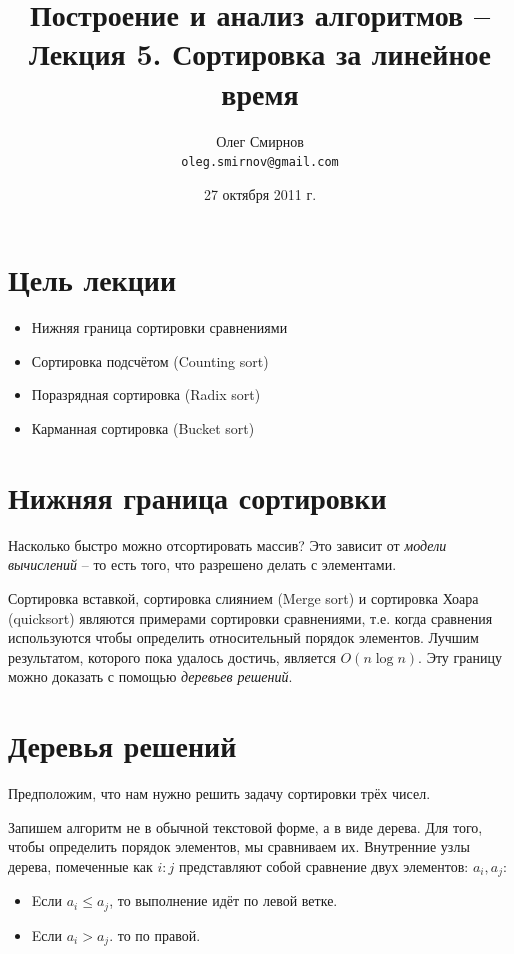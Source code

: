 \documentclass[a4paper,11pt]{article}
\author{Олег Смирнов\\
\texttt{oleg.smirnov@gmail.com}}
\date{27 октября 2011 г.}
\title{Построение и анализ алгоритмов -- Лекция 5. Сортировка за линейное время}
\begin{document}
\maketitle
\tableofcontents
\newpage

\setlength{\parskip}{1ex plus 0.5ex minus 0.2ex}

\section*{Цель лекции}
\begin{itemize}
\item Нижняя граница сортировки сравнениями
\item Сортировка подсчётом (Counting sort)
\item Поразрядная сортировка (Radix sort)
\item Карманная сортировка (Bucket sort)
\end{itemize}

\section{Нижняя граница сортировки}
Насколько быстро можно отсортировать массив? Это зависит от \emph{модели
вычислений} -- то есть того, что разрешено делать с элементами.

Сортировка вставкой, сортировка слиянием (Merge sort) и сортировка Хоара
(quicksort) являются примерами сортировки сравнениями, т.е. когда сравнения
используются чтобы определить относительный порядок элементов. Лучшим
результатом, которого пока удалось достичь, является $O(n \log n)$. Эту границу
можно доказать с помощью \emph{деревьев решений}.

\section{Деревья решений}
Предположим, что нам нужно решить задачу сортировки трёх чисел.

Запишем алгоритм не в обычной текстовой форме, а в виде дерева. Для того, чтобы
определить порядок элементов, мы сравниваем их. Внутренние узлы дерева, 
помеченные как $i:j$ представляют собой сравнение двух элементов: $a_i, a_j$:
\begin{itemize}
\item Eсли $a_i \leqslant a_j$, то выполнение идёт по левой ветке.
\item Eсли $a_i > a_j$. то по правой.
\end{itemize}
\end{document}
